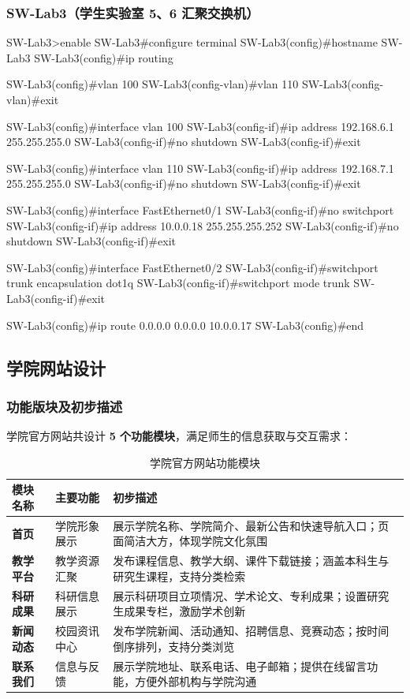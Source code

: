 \documentclass[12pt,a4paper]{ctexart}
\begin{document}
\subsubsection{SW-Lab3（学生实验室 5、6 汇聚交换机）}

\begin{codeblock}
SW-Lab3>enable
SW-Lab3#configure terminal
SW-Lab3(config)#hostname SW-Lab3
SW-Lab3(config)#ip routing

SW-Lab3(config)#vlan 100
SW-Lab3(config-vlan)#vlan 110
SW-Lab3(config-vlan)#exit

SW-Lab3(config)#interface vlan 100
SW-Lab3(config-if)#ip address 192.168.6.1 255.255.255.0
SW-Lab3(config-if)#no shutdown
SW-Lab3(config-if)#exit

SW-Lab3(config)#interface vlan 110
SW-Lab3(config-if)#ip address 192.168.7.1 255.255.255.0
SW-Lab3(config-if)#no shutdown
SW-Lab3(config-if)#exit

SW-Lab3(config)#interface FastEthernet0/1
SW-Lab3(config-if)#no switchport
SW-Lab3(config-if)#ip address 10.0.0.18 255.255.255.252
SW-Lab3(config-if)#no shutdown
SW-Lab3(config-if)#exit

SW-Lab3(config)#interface FastEthernet0/2
SW-Lab3(config-if)#switchport trunk encapsulation dot1q
SW-Lab3(config-if)#switchport mode trunk
SW-Lab3(config-if)#exit

SW-Lab3(config)#ip route 0.0.0.0 0.0.0.0 10.0.0.17
SW-Lab3(config)#end
\end{codeblock}

\subsection{学院网站设计}

\subsubsection{功能版块及初步描述}

学院官方网站共设计 \textbf{5 个功能模块}，满足师生的信息获取与交互需求：

\begin{table}[H]
\centering
\caption{学院官方网站功能模块}
\begin{tabular}{L{2cm}L{2.5cm}L{8.5cm}}
\toprule
\textbf{模块名称} & \textbf{主要功能} & \textbf{初步描述} \\
\midrule
\textbf{首页}     & 学院形象展示 & 展示学院名称、学院简介、最新公告和快速导航入口；页面简洁大方，体现学院文化氛围 \\
\midrule
\textbf{教学平台} & 教学资源汇聚 & 发布课程信息、教学大纲、课件下载链接；涵盖本科生与研究生课程，支持分类检索 \\
\midrule
\textbf{科研成果} & 科研信息展示 & 展示科研项目立项情况、学术论文、专利成果；设置研究生成果专栏，激励学术创新 \\
\midrule
\textbf{新闻动态} & 校园资讯中心 & 发布学院新闻、活动通知、招聘信息、竞赛动态；按时间倒序排列，支持分类浏览 \\
\midrule
\textbf{联系我们} & 信息与反馈   & 展示学院地址、联系电话、电子邮箱；提供在线留言功能，方便外部机构与学院沟通 \\
\bottomrule
\end{tabular}
\end{table}
\end{document}
